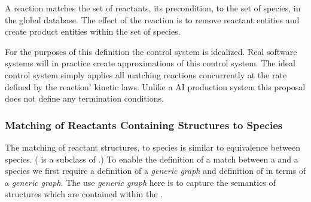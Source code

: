 \documentclass{cekarticle}
\begin{document}
A reaction matches the set of reactants, its precondition, to the
set of species, in the global database.  The effect of the
reaction is to remove reactant entities and create product
entities within the set of species.

For the purposes of this definition the control system is
idealized. Real software systems will in practice create
approximations of this control system.  The ideal control system
simply applies all matching reactions concurrently at the rate
defined by the reaction' kinetic laws.  Unlike a AI production
system this proposal does not define any termination conditions.

\subsubsection{Matching of Reactants Containing  Structures to Species}

The matching of reactant  structures, to
species is similar to equivalence between species.
( is a subclass of
.)  To enable the definition of a
match between a  and a species we first
require a definition of a \emph{generic graph} and definition of
 in terms of a \emph{generic graph}. The
use \emph{generic graph} here is to capture the semantics of
 structures which are contained within the
.
\end{document}
